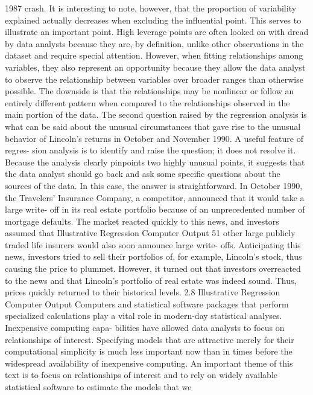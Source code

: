\documentclass[11pt]{article}
\begin{document}
1987 crash. It is interesting to note, however, that the proportion of variability
explained actually decreases when excluding the influential point. This serves
to illustrate an important point. High leverage points are often looked on with
 dread by data analysts because they are, by definition, unlike other observations
 in the dataset and require special attention. However, when fitting relationships
 among variables, they also represent an opportunity because they allow the data
analyst to observe the relationship between variables over broader ranges than
otherwise possible. The downside is that the relationships may be nonlinear or
follow an entirely different pattern when compared to the relationships observed
 in the main portion of the data.
The second question raised by the regression analysis is what can be said
about the unusual circumstances that gave rise to the unusual behavior of
Lincoln's returns in October and November 1990. A useful feature of regres-
sion analysis is to identify and raise the question; it does not resolve it. Because
the analysis clearly pinpoints two highly unusual points, it suggests that the data
 analyst should go back and ask some specific questions about the sources of the
data. In this case, the answer is straightforward. In October 1990, the Travelers'
Insurance Company, a competitor, announced that it would take a large write-
 off in its real estate portfolio because of an unprecedented number of mortgage
defaults. The market reacted quickly to this news, and investors assumed that
 Illustrative Regression Computer Output 51
other large publicly traded life insurers would also soon announce large write-
 offs. Anticipating this news, investors tried to sell their portfolios of, for example,
Lincoln's stock, thus causing the price to plummet. However, it turned out that
investors overreacted to the news and that Lincoln's portfolio of real estate was
indeed sound. Thus, prices quickly returned to their historical levels.
2.8 Illustrative Regression Computer Output
Computers and statistical software packages that perform specialized calculations
 play a vital role in modern-day statistical analyses. Inexpensive computing capa-
 bilities have allowed data analysts to focus on relationships of interest. Specifying
 models that are attractive merely for their computational simplicity is much less
 important now than in times before the widespread availability of inexpensive
computing. An important theme of this text is to focus on relationships of interest
 and to rely on widely available statistical software to estimate the models that we
\end{document}
